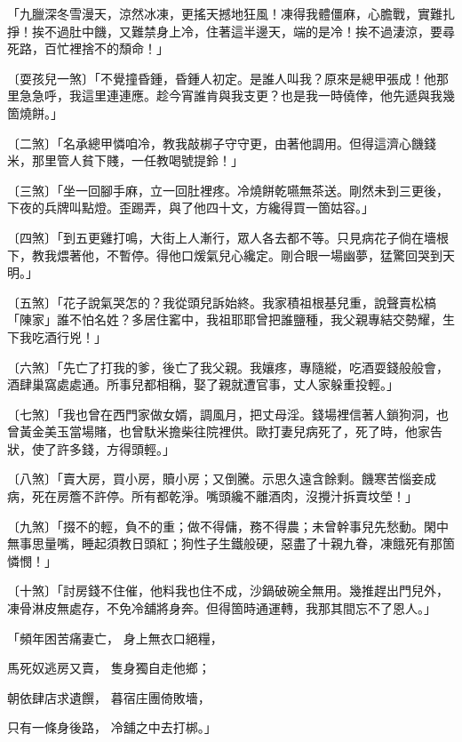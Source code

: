 \begin{showcontents}{}
「九臘深冬雪漫天，涼然冰凍，更搖天撼地狂風！凍得我體僵麻，心膽戰，實難扎掙！挨不過肚中饑，又難禁身上冷，住著這半邊天，端的是冷！挨不過淒涼，要尋死路，百忙裡捨不的頹命！」

〔耍孩兒一煞〕「不覺撞昏鍾，昏鍾人初定。是誰人叫我？原來是總甲張成！他那里急急呼，我這里連連應。趁今宵誰肯與我支更？也是我一時僥倖，他先遞與我幾箇燒餅。」

〔二煞〕「名承總甲憐咱冷，教我敲梆子守守更，由著他調用。但得這濟心饑錢米，那里管人貧下賤，一任教喝號提鈴！」

〔三煞〕「坐一回腳手麻，立一回肚裡疼。冷燒餅乾嚥無茶送。剛然未到三更後，下夜的兵牌叫點燈。歪踢弄，與了他四十文，方纔得買一箇姑容。」

〔四煞〕「到五更雞打鳴，大街上人漸行，眾人各去都不等。只見病花子倘在墻根下，教我煨著他，不暫停。得他口煖氣兒心纔定。剛合眼一場幽夢，猛驚回哭到天明。」

〔五煞〕「花子說氣哭怎的？我從頭兒訴始終。我家積祖根基兒重，說聲賣松槁「陳家」誰不怕名姓？多居住窰中，我祖耶耶曾把誰鹽種，我父親專結交勢耀，生下我吃酒行兇！」

〔六煞〕「先亡了打我的爹，後亡了我父親。我孃疼，專隨縱，吃酒耍錢般般會，酒肆巢窩處處通。所事兒都相稱，娶了親就遭官事，丈人家躲重投輕。」

〔七煞〕「我也曾在西門家做女婿，調風月，把丈母淫。錢場裡信著人鎖狗洞，也曾黃金美玉當場賭，也曾馱米擔柴往院裡供。歐打妻兒病死了，死了時，他家告狀，使了許多錢，方得頭輕。」

〔八煞〕「賣大房，買小房，贖小房；又倒騰。示思久遠含餘剩。饑寒苦惱妾成病，死在房簷不許停。所有都乾淨。嘴頭纔不離酒肉，沒攪汁拆賣坟塋！」

〔九煞〕「掇不的輕，負不的重；做不得傭，務不得農；未曾幹事兒先愁動。閑中無事思量嘴，睡起須教日頭紅；狗性子生鐵般硬，惡盡了十親九眷，凍餓死有那箇憐憫！」

〔十煞〕「討房錢不住催，他料我也住不成，沙鍋破碗全無用。幾推趕出門兒外，凍骨淋皮無處存，不免冷舖將身奔。但得箇時通運轉，我那其間忘不了恩人。」

「頻年困苦痛妻亡，  身上無衣口絕糧，

馬死奴逃房又賣，  隻身獨自走他鄉；

朝依肆店求遺饌，  暮宿庄團倚敗墻，

只有一條身後路，  冷舖之中去打梆。」


\end{showcontents}
